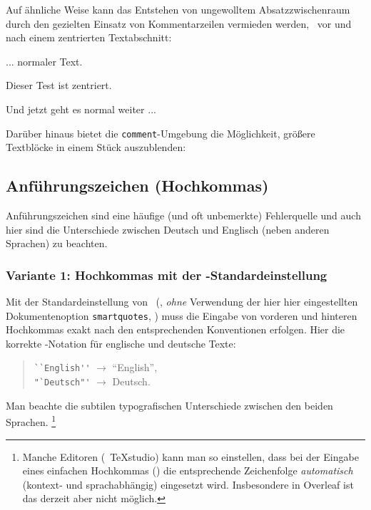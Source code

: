 \begin{sloppypar}
    \noindent
    Auf ähnliche Weise kann das Entstehen von ungewolltem Absatzzwischenraum
    durch den gezielten Einsatz von Kommentarzeilen vermieden werden, \zB\
    vor und nach einem zentrierten Textabschnitt:
\end{sloppypar}
%
\begin{LaTeXCode}[numbers=none]
... normaler Text.
%
\begin{center}
   Dieser Test ist zentriert.
\end{center}
%
Und jetzt geht es normal weiter ...
\end{LaTeXCode}
%
Darüber hinaus bietet die \verb!comment!-Umgebung die Möglichkeit, größere
Text\-blöcke in einem Stück auszublenden:
%
\begin{LaTeXCode}[numbers=none]
\begin{comment}
Dieser Text ...
   ... wird ignoriert.
\end{comment}
\end{LaTeXCode}

\subsection{Anführungszeichen (Hochkommas)}
\label{sec:anfuehrungszeichen}

Anführungszeichen sind eine häufige (und oft unbemerkte) Fehlerquelle und
auch hier sind die Unterschiede zwischen Deutsch und Englisch (neben anderen
Sprachen) zu beachten.

\subsubsection{Variante 1: Hochkommas mit der \latex-Standardeinstellung}

Mit der Standardeinstellung von \latex\ (\dah, \emph{ohne} Verwendung der
hier hier eingestellten Dokumentenoption \texttt{smartquotes}, \su)
muss die Eingabe von vorderen und hinteren Hochkommas exakt nach den
entsprechenden Konventionen erfolgen. Hier die korrekte \latex-Notation für
englische und deutsche Texte:
%
\begin{quote}
    \verb!``English''! $\rightarrow$ ``English'',\\
    \verb!"`Deutsch"'! $\rightarrow$ {\glqq}Deutsch{\grqq}.
\end{quote}
%
Man beachte die subtilen typografischen Unterschiede zwischen den beiden
Sprachen.%
\footnote{Manche Editoren (\zB\ \textsf{TeXstudio}) kann man so einstellen,
    dass bei der Eingabe eines einfachen Hochkommas (\texttt{\textquotedbl})
    die entsprechende Zeichenfolge \emph{automatisch} (kontext- und
    sprachabhängig) eingesetzt wird. Insbesondere in \textsf{Overleaf} ist
    das derzeit aber nicht möglich.}

